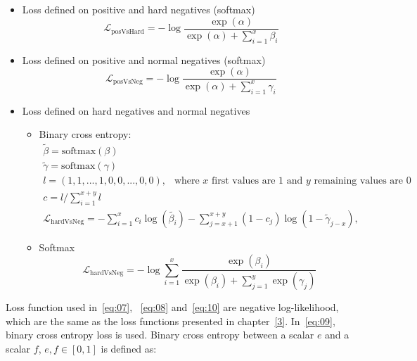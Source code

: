 \documentclass[12pt, sort&compress]{report}
\begin{document}
\begin{itemize}
	\item Loss defined on positive and hard negatives (softmax)
	\begin{equation}
		\label{eq:07}
		\mathcal{L}_{\text{posVsHard}} = -\log\dfrac{\exp\left(\alpha\right)}{\exp\left(\alpha\right) + \sum\limits_{i=1}^x\beta_i}
	\end{equation}
	\item Loss defined on positive and normal negatives (softmax)
	\begin{equation}
		\label{eq:08}
		\mathcal{L}_{\text{posVsNeg}} = -\log\dfrac{\exp\left(\alpha\right)}{\exp\left(\alpha\right) + \sum\limits_{i=1}^x\gamma_i}
	\end{equation}
	\item Loss defined on hard negatives and normal negatives
	\begin{itemize}
		\item Binary cross entropy:
		\begin{equation}
			\label{eq:09}
			\begin{array}{l}
				\tilde{\beta} = \text{softmax}(\beta) \\
				\tilde{\gamma} = \text{softmax}(\gamma) \\ 
				l = (1, 1, ..., 1, 0, 0, ... ,0, 0),\:\: \text{ where } x \text{ first values are 1 and } y \text{ remaining values are 0 } \\
				c = l / \sum\limits_{i=1}^{x + y} l \\
				\mathcal{L}_{\text{hardVsNeg}} = -\sum\limits_{i=1}^x c_i\log\left(\tilde{\beta_i}\right) - \sum\limits_{j=x+1}^{x+y}(1 - c_j)\log(1-\tilde{\gamma}_{j-x}),
			\end{array}
		\end{equation}
		\item Softmax
		\begin{equation}
			\label{eq:10}
			\mathcal{L}_{\text{hardVsNeg}} = -\log\sum\limits_{i=1}^x\dfrac{\exp\left(\beta_i\right)}{\exp\left(\beta_i\right) + \sum\limits_{j=1}^y\exp\left(\gamma_j\right)}
		\end{equation}
	\end{itemize}
\end{itemize}
\par Loss function used in~\eqref{eq:07}, ~\eqref{eq:08} and~\eqref{eq:10} are negative log-likelihood, which are the same as the loss functions presented in chapter~\ref{3}. In~\eqref{eq:09}, binary cross entropy loss is used. Binary cross entropy between a scalar $e$ and a scalar $f$, $e, f \in [0, 1]$ is defined as:
\end{document}
